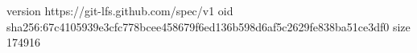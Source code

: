 version https://git-lfs.github.com/spec/v1
oid sha256:67c4105939e3cfc778bcee458679f6ed136b598d6af5c2629fe838ba51ce3df0
size 174916
